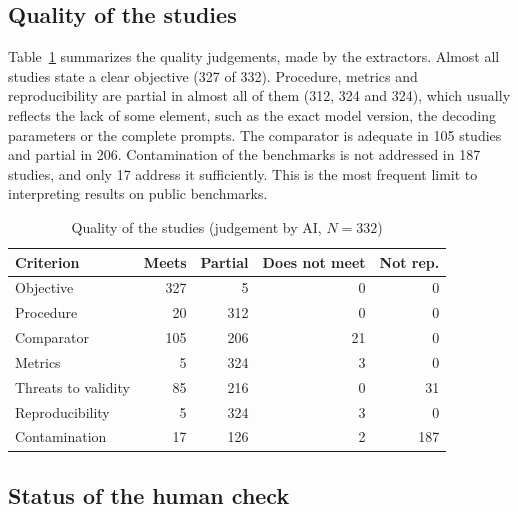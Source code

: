 



\subsection{Quality of the studies}\label{sec:qualidade}
Table~\ref{tab:qualidade} summarizes the quality judgements, made by the extractors. Almost all studies
state a clear objective (327 of 332). Procedure, metrics and reproducibility are partial in almost all of them (312,
324 and 324), which usually reflects the lack of some element, such as the exact model version, the decoding
parameters or the complete prompts. The comparator is adequate in 105 studies and partial in 206. Contamination of the
benchmarks is not addressed in 187 studies, and only 17 address it sufficiently. This is the most
frequent limit to interpreting results on public benchmarks.

\begin{table}[!t]
\caption{Quality of the studies (judgement by AI, $N = 332$)}\label{tab:qualidade}
\centering\footnotesize
\begin{tabular}{@{}lrrrr@{}}
\hline
Criterion & Meets & Partial & Does not meet & Not rep.\\
\hline
Objective & 327 & 5 & 0 & 0\\
Procedure & 20 & 312 & 0 & 0\\
Comparator & 105 & 206 & 21 & 0\\
Metrics & 5 & 324 & 3 & 0\\
Threats to validity & 85 & 216 & 0 & 31\\
Reproducibility & 5 & 324 & 3 & 0\\
Contamination & 17 & 126 & 2 & 187\\
\hline
\end{tabular}
\end{table}




\subsection{Status of the human check}\label{sec:conferencia}

